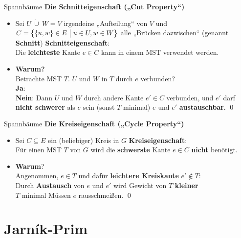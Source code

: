 \begin{frame}{Spannbäume} %
	\textbf{Die Schnitteigenschaft („Cut Property“)} 
	\begin{itemize}
		\item Sei $U\ \dot{\cup}\ W = V$ irgendeine „Aufteilung“ von $V$ und $C = \big\lbrace \{u, w\} \in E \bigm| u \in U, w \in W \big\rbrace$ alle „Brücken dazwischen“ (genannt \textbf{Schnitt})
		\pause
		\implitem \textbf{Schnitteigenschaft}: \\ 
		Die \textbf{leichteste} Kante $e \in C$ kann in einem MST verwendet werden.
		\pause 
		\item \textbf{Warum?} \\
		\pause \impl Betrachte MST $T$. $U$ und $W$ in $T$ durch $e$ verbunden? \\
		\impl \textbf{Ja}: \yop \\
		\impl \textbf{Nein}: Dann $U$ und $W$ durch andere Kante $e' \in C$ verbunden, und $e'$ darf \textbf{nicht schwerer} als $e$ sein (sonst \crash $T$ minimal) \impl $e$ und $e'$ \textbf{austauschbar}. \qed
	\end{itemize}
\end{frame}


\begin{frame}{Spannbäume}
	\textbf{Die Kreiseigenschaft („Cycle Property“)} 
	\begin{itemize}
		\item Sei $C \subseteq E$ ein  (beliebiger) Kreis in $G$
		\pause
		\implitem \textbf{Kreiseigenschaft}: \\ 
		Für einen MST $T$ von $G$ wird die \textbf{schwerste} Kante $e \in C$ \textbf{nicht} benötigt.
		\pause 
		\item \textbf{Warum}? \\
		\pause \impl Angenommen, $e \in T$ und dafür \textbf{leichtere Kreiskante} $e' \notin T$: \\
		Durch \textbf{Austausch} von $e$ und $e'$ wird Gewicht von $T$ \textbf{kleiner} \\ 
		\impl \crash $T$ minimal \impl Müssen $e$ rausschmeißen. \qed
	\end{itemize}
\end{frame}

\section{Jarník-Prim}

